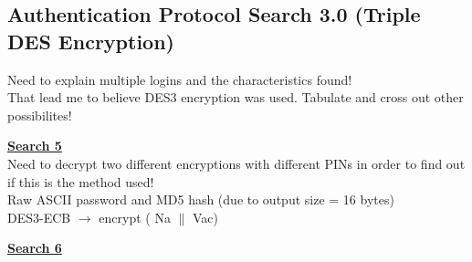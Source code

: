 \documentclass[bsc,frontabs,twoside,singlespacing,parskip,deptreport]{infthesis}     %
\begin{document}
\subsection{Authentication Protocol Search 3.0 (Triple DES Encryption)}

Need to explain multiple logins and the characteristics found!\\
That lead me to believe DES3 encryption was used. Tabulate and cross out other possibilites!

%
%


\textbf{\underline{Search 5}}\\
Need to decrypt two different encryptions with different PINs in order to find out if this is the method used!\\
Raw ASCII password and MD5 hash (due to output size = 16 bytes)\\
DES3-ECB $\rightarrow$ encrypt ( Na $\|$ Vac)

\textbf{\underline{Search 6}}\\
\end{document}
